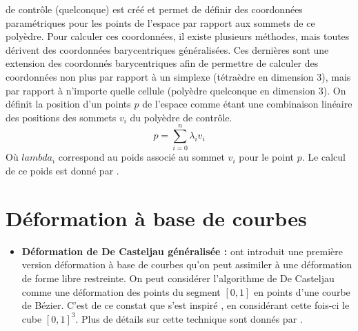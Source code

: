 \begin{itemize}
  de contrôle (quelconque) est créé et permet de définir des
  coordonnées paramétriques pour les points de l'espace par rapport
  aux sommets de ce polyèdre. Pour calculer ces coordonnées, il existe
  plusieurs méthodes, mais toutes dérivent des coordonnées
  barycentriques généralisées. Ces dernières sont une extension des
  coordonnés barycentriques afin de permettre de calculer des
  coordonnées non plus par rapport à un simplexe (tétraèdre en
  dimension 3), mais par rapport à n'importe quelle cellule (polyèdre
  quelconque en dimension 3). On définit la position d'un points $p$
  de l'espace comme étant une combinaison linéaire des positions des
  sommets $v_i$ du polyèdre de contrôle.
  \begin{equation}
    p = \sum_{i=0}^n \lambda_iv_i
  \end{equation}
  Où $lambda_i$ correspond au poids associé au sommet $v_i$ pour le point
  $p$. Le calcul de ce poids est donné par \cite{FKR05}.
\end{itemize}

\section{Déformation à base de courbes}
\begin{itemize}
\item{\textbf{Déformation de De Casteljau généralisée :}} \cite{CR94}
  ont introduit une première version déformation à base de courbes
  qu'on peut assimiler à une déformation de forme libre restreinte. On
  peut considérer l'algorithme de De Casteljau comme une déformation
  des points du segment $[0,1]$ en points d'une courbe de
  Bézier. C'est de ce constat que s'est inspiré \cite{CR94}, en
  considérant cette fois-ci le cube $[0,1]^3$. Plus de détails sur
  cette technique sont donnés par \cite{BE01}.
\end{itemize}

